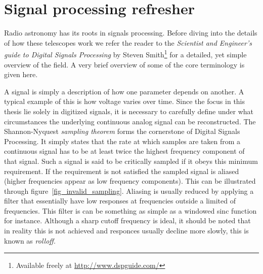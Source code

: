 \chapter{Signal processing refresher}
Radio astronomy has its roots in signals processing. Before diving into the details of how these telescopes work we refer the reader to the \textit{Scientist and Engineer's guide to Digital Signals Processing} by 
Steven Smith\footnote{Available freely at \url{http://www.dspguide.com/}}\cite{smith1997scientist} for a detailed, yet simple overview of the field. A very brief overview of some of the core terminology is given here.

A signal is simply a description of how one parameter depends on another. A typical example of this is how voltage varies over time. Since the focus in this thesis lie solely in digitized signals, it is necessary to carefully
define under what circumstances the underlying continuous analog signal can be reconstructed. The Shannon-Nyquest \textit{sampling theorem} forms the cornerstone of Digital Signals Processing. It simply states that the rate at
which samples are taken from a continuous signal has to be at least twice the highest frequency component of that signal. Such a signal is said to be critically sampled if it obeys this minimum requirement. If the requirement is
not satisfied the sampled signal is aliased (higher frequencies appear as low frequency components). This can be illustrated through figure~\ref{fig_invalid_sampling}. Aliasing is usually reduced by applying a filter that essentially
have low responses at frequencies outside a limited  of frequencies. This filter is can be something as simple as a windowed sinc function for instance. Although a sharp cutoff frequency is ideal, it should be noted 
that in reality this is not achieved and responces usually decline more slowly, this is known as \textit{rolloff}.

